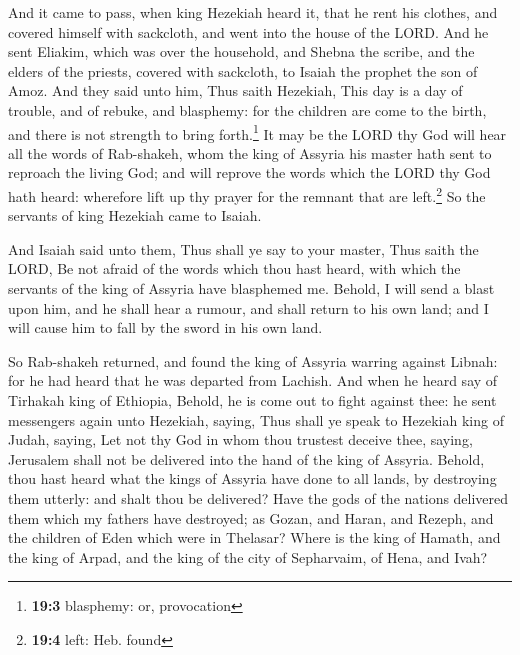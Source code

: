  And it came to pass, when king Hezekiah heard it, that he
rent his clothes, and covered himself with sackcloth, and went into the
house of the LORD.  And he sent Eliakim, which was over
the household, and Shebna the scribe, and the elders of the priests,
covered with sackcloth, to Isaiah the prophet the son of Amoz.
 And they said unto him, Thus saith Hezekiah, This day is
a day of trouble, and of rebuke, and blasphemy: for the children are
come to the birth, and there is not strength to bring forth.\footnote{\textbf{19:3}
  blasphemy: or, provocation}  It may be the LORD thy God
will hear all the words of Rab-shakeh, whom the king of Assyria his
master hath sent to reproach the living God; and will reprove the words
which the LORD thy God hath heard: wherefore lift up thy prayer for the
remnant that are left.\footnote{\textbf{19:4} left: Heb. found}
 So the servants of king Hezekiah came to Isaiah.

 And Isaiah said unto them, Thus shall ye say to your
master, Thus saith the LORD, Be not afraid of the words which thou hast
heard, with which the servants of the king of Assyria have blasphemed
me.  Behold, I will send a blast upon him, and he shall
hear a rumour, and shall return to his own land; and I will cause him to
fall by the sword in his own land.

 So Rab-shakeh returned, and found the king of Assyria
warring against Libnah: for he had heard that he was departed from
Lachish.  And when he heard say of Tirhakah king of
Ethiopia, Behold, he is come out to fight against thee: he sent
messengers again unto Hezekiah, saying,  Thus shall ye
speak to Hezekiah king of Judah, saying, Let not thy God in whom thou
trustest deceive thee, saying, Jerusalem shall not be delivered into the
hand of the king of Assyria.  Behold, thou hast heard
what the kings of Assyria have done to all lands, by destroying them
utterly: and shalt thou be delivered?  Have the gods of
the nations delivered them which my fathers have destroyed; as Gozan,
and Haran, and Rezeph, and the children of Eden which were in Thelasar?
 Where is the king of Hamath, and the king of Arpad, and
the king of the city of Sepharvaim, of Hena, and Ivah?

